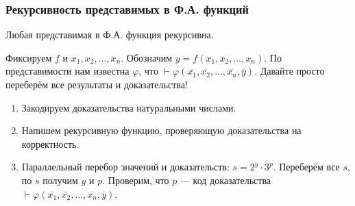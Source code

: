 \subsubsection{Рекурсивность представимых в Ф.А. функций}

\begin{theorem}Любая представимая в Ф.А. функция рекурсивна.\end{theorem}

Фиксируем $f$ и $x_1, x_2, \dots, x_n$. Обозначим $y = f(x_1,x_2,\dots,x_n)$.
По представимости нам известна $\varphi$, что $\vdash \varphi(\overline{x_1},\overline{x_2},\dots,\overline{x_n},\overline{y})$.
Давайте просто переберём все результаты и доказательства!

\begin{enumerate}
\item Закодируем доказательства натуральными числами.
\item Напишем рекурсивную функцию, проверяющую доказательства на корректность.
\item Параллельный перебор значений и доказательств: $s = 2^y \cdot 3^p$. Переберём все $s$, по $s$ получим $y$ и $p$.
Проверим, что $p$ --- код доказательства $\vdash \varphi(\overline{x_1},\overline{x_2},\dots,\overline{x_n},\overline{y})$.
\end{enumerate}


